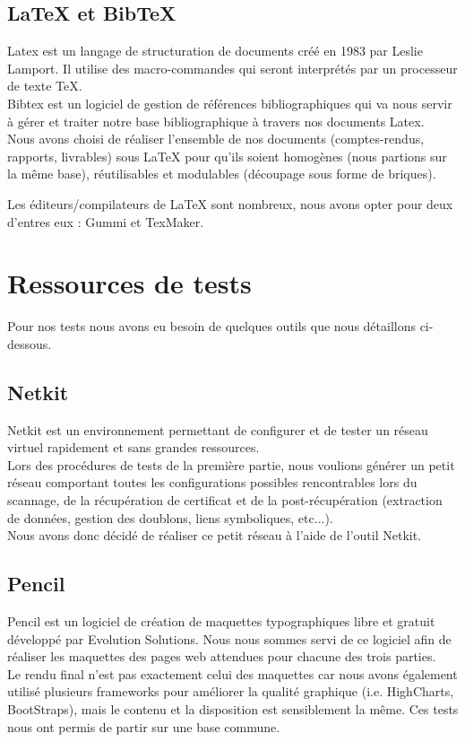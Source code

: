 \subsection{LaTeX et BibTeX}

Latex est un langage de structuration de documents créé en 1983 par Leslie Lamport. Il utilise des macro-commandes qui seront interprétés par un processeur de texte TeX.\\
Bibtex est un logiciel de gestion de références bibliographiques qui va nous servir à gérer et traiter notre base bibliographique à travers nos documents Latex.\\

Nous avons choisi de réaliser l'ensemble de nos documents (comptes-rendus, rapports, livrables) sous LaTeX pour qu'ils soient homogènes (nous partions sur la même base), réutilisables et modulables (découpage sous forme de briques).

Les éditeurs/compilateurs de LaTeX sont nombreux, nous avons opter pour deux d'entres eux : Gummi et TexMaker.

\section{Ressources de tests}

Pour nos tests nous avons eu besoin de quelques outils que nous détaillons ci-dessous.

\subsection{Netkit}

Netkit est un environnement permettant de configurer et de tester un réseau virtuel rapidement et sans grandes ressources.\\
Lors des procédures de tests de la première partie, nous voulions générer un petit réseau comportant toutes les configurations possibles rencontrables lors du scannage, de la récupération de certificat et de la post-récupération (extraction de données, gestion des doublons, liens symboliques, etc...).\\
Nous avons donc décidé de réaliser ce petit réseau à l'aide de l'outil Netkit.

\subsection{Pencil}

Pencil est un logiciel de création de maquettes typographiques libre et gratuit développé par Evolution Solutions.
Nous nous sommes servi de ce logiciel afin de réaliser les maquettes des pages web attendues pour chacune des trois parties.\\
Le rendu final n'est pas exactement celui des maquettes car nous avons également utilisé plusieurs frameworks pour améliorer la qualité graphique (i.e. HighCharts, BootStraps), mais le contenu et la disposition est sensiblement la même.
Ces tests nous ont permis de partir sur une base commune.

